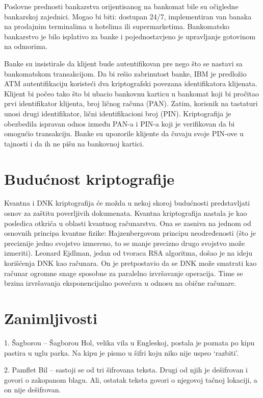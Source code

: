 \documentclass[a4paper]{article}
\begin{document}
Poslovne prednosti bankarstva orijentisanog na bankomat bile su očigledne bankarskoj zajednici. Mogao bi biti: dostupan 24/7,  implementiran van banaka na prodajnim terminalima u hotelima ili supermarketima. Bankomatsko bankarstvo je bilo isplativo za banke i pojednostavjeno je upravljanje gotovinom na odmorima.

 Banke su insistirale da klijent bude autentifikovan pre nego što se nastavi sa bankomatskom transakcijom. Da bi rešio zabrinutost banke, IBM je predložio ATM autentifikaciju koristeći dva kriptografski povezana identifikatora klijenata. Klijent bi počeo tako što bi ubacio bankovnu karticu u bankomat koji bi pročitao prvi identifikator klijenta, broj ličnog računa (PAN). Zatim, korisnik na tastaturi unosi drugi identifikator, lični identifikacioni broj (PIN). Kriptografija je obezbedila ispravan odnos između PAN-a i PIN-a koji je verifikovan da bi omogućio transakciju. Banke su upozorile klijente da čuvaju svoje PIN-ove u tajnosti i da ih ne pišu na bankovnoj kartici.

\section{Budućnost kriptografije}
\label{sec:budućnost_kriptografije}
Kvantna i DNK kriptografija će možda u nekoj skoroj budućnosti predstavljati osnov za zaštitu poverljivih dokumenata. Kvantna kriptografija nastala je kao posledica otkrića u oblasti kvantnog računarstva. Ona se zasniva na jednom od osnovnih principa kvantne fizike: Hajzenbergovom principu neodređenosti (što je preciznije jedno svojstvo izmereno, to se manje precizno drugo svojstvo može izmeriti). Leonard Ejdlman, jedan od tvoraca RSA algoritma, došao je na ideju korišćenja DNK kao računara. On je pretpostavio
da se DNK može smatrati kao računar ogromne snage sposobne za paralelno izvršavanje operacija. Time se brzina izvršavanja eksponencijalno povećava u odnosu na obične računare.

\section{Zanimljivosti}
\label{sec:zanimljivosti}

1. Šagborou – Šagborou Hol, velika vila u Engleskoj, postala je poznata po kipu pastira u uglu parka. Na kipu je pismo u šifri
koju niko nije uspeo ‘razbiti’.

2. Pamflet Bil – sastoji se od tri šifrovana teksta. Drugi od njih je dešifrovan i govori o zakopanom blagu. Ali, ostatak teksta govori o njegovoj tačnoj lokaciji, a on nije dešifrovan.
\end{document}
